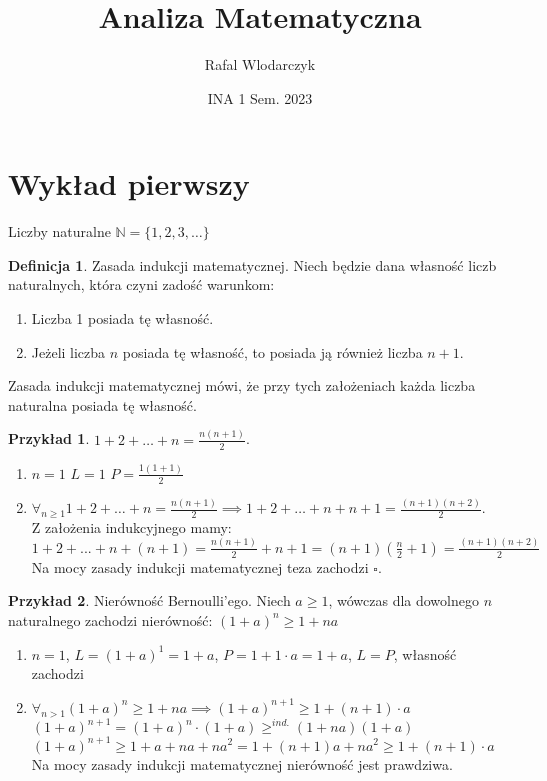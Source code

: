 \documentclass{article}
\author{Rafal Wlodarczyk}
\title{Analiza Matematyczna}
\date{INA 1 Sem. 2023}
\theoremstyle{definition}
\newtheorem{de}{Definicja}[subsection]
\theoremstyle{definition}
\theoremstyle{definition}
\newtheorem{pk}{Przykład}[subsection]
\theoremstyle{definition}
\begin{document}
\maketitle

\section{Wykład pierwszy}

Liczby naturalne $\mathbb{N}=\{1,2,3,\dots\}$

\begin{de}
    Zasada indukcji matematycznej. Niech będzie dana własność liczb naturalnych, która czyni zadość warunkom:
    \begin{enumerate}
        \item Liczba 1 posiada tę własność.
        \item Jeżeli liczba $n$ posiada tę własność, to posiada ją również liczba $n+1$.
    \end{enumerate}
    Zasada indukcji matematycznej mówi, że przy tych założeniach każda liczba naturalna posiada tę własność.
\end{de}

\begin{pk}
    $1+2+\dots+n=\frac{n(n+1)}{2}$.
    \begin{enumerate}
        \item $n=1$ $L=1$ $P=\frac{1(1+1)}{2}$
        \item $\forall_{n\geq 1} 1+2+\dots+n=\frac{n(n+1)}{2} \implies 1+2+\dots+n+n+1=\frac{(n+1)(n+2)}{2}$.\\
        Z założenia indukcyjnego mamy:\\
        $1+2+...+n+(n+1)=\frac{n(n+1)}{2}+n+1=(n+1)(\frac{n}{2}+1)=\frac{(n+1)(n+2)}{2}$\\
        Na mocy zasady indukcji matematycznej teza zachodzi $\square$.
    \end{enumerate}
\end{pk}

\begin{pk}
    Nierówność Bernoulli'ego. Niech $a\geq 1$, wówczas dla dowolnego $n$ naturalnego zachodzi nierówność:
    $(1+a)^n \geq 1 + na$
    \begin{enumerate}
        \item $n=1$, $L=(1+a)^1 = 1+a$, $P=1+1\cdot a = 1+ a$, $L=P$, własność zachodzi
        \item $\forall_{n>1} (1+a)^n \geq 1 + na \implies (1+a)^{n+1} \geq 1 + (n+1)\cdot a$\\
        $(1+a)^{n+1}=(1+a)^n\cdot(1+a)\geq^{ind.} (1+na)(1+a)$\\
        $(1+a)^{n+1} \geq 1 + a + na + na^2 = 1 + (n+1)a + na^2 \geq 1 + (n+1)\cdot a$\\
        Na mocy zasady indukcji matematycznej nierówność jest prawdziwa.
    \end{enumerate}
\end{pk}
\end{document}
